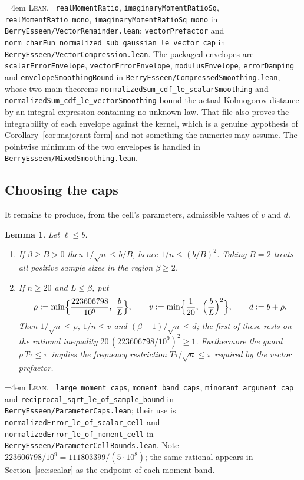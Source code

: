 \documentclass[10pt,a4paper]{article}
\theoremstyle{plain}
\newtheorem{lemma}[theorem]{Lemma}
\theoremstyle{definition}
\newcommand{\lean}[1]{\texttt{#1}}
\newcommand{\file}[1]{\texttt{#1}}
\newenvironment{leanref}%
  {\par\addvspace{3pt}\begingroup\sloppy\emergencystretch=4em
   \noindent\footnotesize\textsc{Lean.}\ \ignorespaces}%
  {\par\endgroup\addvspace{3pt}}
\begin{document}
\begin{leanref}
\lean{realMomentRatio}, \lean{imaginaryMomentRatioSq},
\lean{realMomentRatio\_mono}, \lean{imaginaryMomentRatioSq\_mono} in
\file{BerryEsseen/VectorRemainder.lean}; \lean{vectorPrefactor} and
\lean{norm\_charFun\_normalized\_sub\_gaussian\_le\_vector\_cap} in
\file{BerryEsseen/VectorCompression.lean}. The packaged envelopes are
\lean{scalarErrorEnvelope}, \lean{vectorErrorEnvelope},
\lean{modulusEnvelope}, \lean{errorDamping} and
\lean{envelopeSmoothingBound} in
\file{BerryEsseen/CompressedSmoothing.lean}, whose two main theorems
\lean{normalizedSum\_cdf\_le\_scalarSmoothing} and
\lean{normalizedSum\_cdf\_le\_vectorSmoothing} bound the actual Kolmogorov
distance by an integral expression containing no unknown law. That file also
proves the integrability of each envelope against the kernel, which is a
genuine hypothesis of Corollary~\ref{cor:majorant-form} and not something the
numerics may assume. The pointwise minimum of the two envelopes is handled in
\file{BerryEsseen/MixedSmoothing.lean}.
\end{leanref}

\subsection{Choosing the caps}
\label{sec:caps}

It remains to produce, from the cell's parameters, admissible values of $v$ and
$d$.

\begin{lemma}\label{lem:caps}
Let $\ell\le b$.
\begin{enumerate}[label=(\alph*),leftmargin=2.4em]
\item If $\beta\ge B>0$ then $1/\sqrt n\le b/B$, hence $1/n\le(b/B)^2$. Taking
  $B=2$ treats all positive sample sizes in the region $\beta\ge2$.
\item If $n\ge20$ and $L\le\beta$, put
  \[
    \rho := \min\Bigl\{\frac{223606798}{10^9},\ \frac bL\Bigr\},
    \qquad
    v := \min\Bigl\{\frac1{20},\ \Bigl(\frac bL\Bigr)^2\Bigr\},
    \qquad
    d := b+\rho .
  \]
  Then $1/\sqrt n\le\rho$, $1/n\le v$ and $(\beta+1)/\sqrt n\le d$; the
  first of these rests on the rational inequality
  $20\,(223606798/10^9)^2\ge1$. Furthermore the guard $\rho\,T\tau\le\pi$
  implies the frequency restriction $T\tau/\sqrt n\le\pi$ required by the
  vector prefactor.
\end{enumerate}
\end{lemma}

\begin{leanref}
\lean{large\_moment\_caps}, \lean{moment\_band\_caps},
\lean{minorant\_argument\_cap} and
\lean{reciprocal\_sqrt\_le\_of\_sample\_bound} in
\file{BerryEsseen/ParameterCaps.lean}; their use is
\lean{normalizedError\_le\_of\_scalar\_cell} and
\lean{normalizedError\_le\_of\_moment\_cell} in
\file{BerryEsseen/ParameterCellBounds.lean}. Note
$223606798/10^9=111803399/(5\cdot10^8)$; the same rational appears in
Section~\ref{sec:scalar} as the endpoint of each moment band.
\end{leanref}
\end{document}
